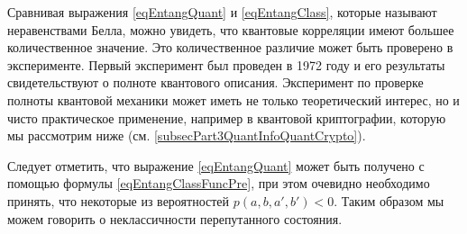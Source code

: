 Сравнивая выражения \eqref{eqEntangQuant} и \eqref{eqEntangClass},
которые называют неравенствами Белла,
можно увидеть, что квантовые корреляции имеют большее количественное
значение. Это количественное различие может быть проверено в
эксперименте. Первый эксперимент был проведен в 1972 году
\cite{PhysRevLett.28.938} и его результаты свидетельствуют о
полноте квантового описания. Эксперимент по проверке полноты квантовой
механики может иметь не только теоретический интерес, но и чисто
практическое применение, например в квантовой криптографии, которую мы
рассмотрим ниже (см. \ref{subsecPart3QuantInfoQuantCrypto}). 

Следует отметить, что выражение \eqref{eqEntangQuant} может быть
получено с помощью формулы  \eqref{eqEntangClassFuncPre}, при этом
очевидно необходимо принять, что некоторые из вероятностей
$p\left(a,b,a',b'\right) < 0$. Таким образом мы можем говорить о
неклассичности перепутанного состояния.  
